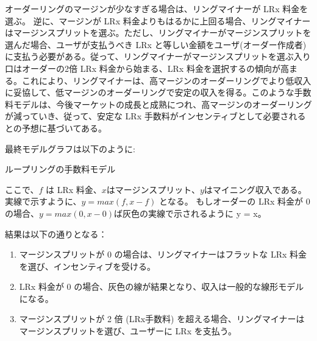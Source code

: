 \documentclass{article}
\makeatletter
\newenvironment{figurehere}
 {\def\@captype{figure}}
 {}
\makeatother
\begin{document}
\begin{multicols}{2}
オーダーリングのマージンが少なすぎる場合は、リングマイナーが LRx 料金を選ぶ。 逆に、マージンが LRx 料金よりもはるかに上回る場合、リングマイナーはマージンスプリットを選ぶ。ただし、リングマイナーがマージンスプリットを選んだ場合、ユーザが支払うべき LRx と等しい金額をユーザ(オーダー作成者)に支払う必要がある。従って、リングマイナーがマージンスプリットを選ぶ入り口はオーダーの2倍 LRx 料金から始まる、LRx 料金を選択するの傾向が高まる。これにより、リングマイナーは、高マージンのオーダーリングでより低収入に妥協して、低マージンのオーダーリングで安定の収入を得る。このような手数料モデルは、今後マーケットの成長と成熟につれ、高マージンのオーダーリングが減っていき、従って、安定な LRx 手数料がインセンティブとして必要されるとの予想に基づいてある。

最終モデルグラフは以下のように:

\begin{center}
\begin{figurehere}
\centering
{}
\caption{ループリングの手数料モデル}
\label{fig:feemodel}
\end{figurehere}
\end{center}

ここで、$f$ は LRx 料金、$x$はマージンスプリット、$y$はマイニング収入である。 実線で示すように、$y=max(f, x-f)$ となる。 
もしオーダーの LRx 料金が 0 の場合、$y=max(0, x - 0)$ば灰色の実線で示されるように y = x。

結果は以下の通りとなる：
\begin{enumerate}
	\item マージンスプリットが 0 の場合は、リングマイナーはフラットな LRx 料金を選び、インセンティブを受ける。
	\item LRx 料金が 0 の場合、灰色の線が結果となり、収入は一般的な線形モデルになる。
	\item マージンスプリットが 2 倍 (LRx手数料) を超える場合、リングマイナーはマージンスプリットを選び、ユーザーに LRx を支払う。
\end{enumerate}


\end{multicols}
\end{document}
